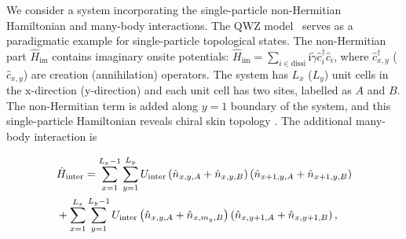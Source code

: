 \documentclass[longbibliography, aps, prx, amsmath, amssymb, amsfonts, twocolumn,superscriptaddress, footinbib]{revtex4-1}
\begin{document}
	 {
	We consider a system incorporating the single-particle non-Hermitian Hamiltonian 
	and many-body interactions. The QWZ model~\cite{qi2006topological} serves 
	as a paradigmatic example for single-particle topological states.
	}
	{
	The non-Hermitian part $\hat{H}_{\text{im}}$ contains imaginary onsite 
	potentials: $\hat{H}_{\text{im}} = \sum_{i\in \text{dissi}} \mathrm{i}\tilde{\gamma} 
	\hat{c}_i^{\dagger} \hat{c}_i$, where $\hat{c}_{{x}, {y}}^{\dagger}$ 
	($\hat{c}_{{x}, {y}}$) are creation (annihilation) operators. 
	The system has $L_x$ ($L_y$) unit cells in the x-direction (y-direction) and each unit cell has two sites, labelled as $A$ and $B$.
	The non-Hermitian term is added along $y=1$ boundary of the system, and this single-particle Hamiltonian reveals chiral skin topology \cite{nakamura2023universal, ma2024non, schindler2023hermitian}.
	}
    The additional many-body interaction is
        \begin{small}
		\begin{align}
			&\hat{H}_{\text{inter}}  = \sum_{{x}=1}^{L_{x}-1} \sum_{{y}=1}^{L_{y}}  U_{\text{inter}} \left(\hat{n}_{{x}, {y}, A}+\hat{n}_{{x}, {y}, B}\right) \left(\hat{n}_{{x}+1, {y}, A}+\hat{n}_{{x}+1, {y}, B}\right)\notag\\
			& + 
			\sum_{{x}=1}^{L_{x}} \sum_{{y}=1}^{L_{y}-1}  U_{\text{inter}} \left(\hat{n}_{{x}, {y}, A}+\hat{n}_{{x}, m_y, B}\right) \left(\hat{n}_{{x}, {y}+1, A}+\hat{n}_{{x}, {y}+1, B}\right), \label{eq:inter_cell}
		\end{align}
        \end{small}
\end{document}
